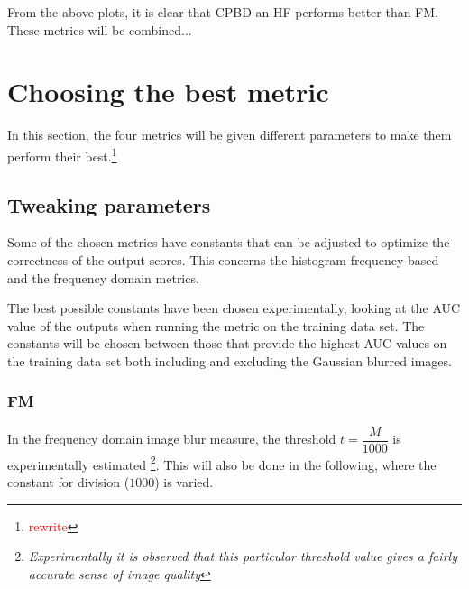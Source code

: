 From the above plots, it is clear that CPBD an HF performs better than FM. These metrics will be combined...


\section{Choosing the best metric}
In this section, the four metrics will be given different parameters to make them perform their best.\footnote{\textcolor{red}{rewrite}}

\subsection{Tweaking parameters}
Some of the chosen metrics have constants that can be adjusted to optimize the correctness of the output scores. This concerns the histogram frequency-based and the frequency domain metrics.

The best possible constants have been chosen experimentally, looking at the AUC value of the outputs when running the metric on the training data set. The constants will be chosen between those that provide the highest AUC values on the training data set both including and excluding the Gaussian blurred images.

\subsubsection{FM}
In the frequency domain image blur measure, the threshold $t=\dfrac{M}{1000}$ is experimentally estimated \footnote{\textit{Experimentally it is observed that this particular threshold value gives a fairly accurate sense of image quality}\cite{FM}}. This will also be done in the following, where the constant for division ($1000$) is varied.

